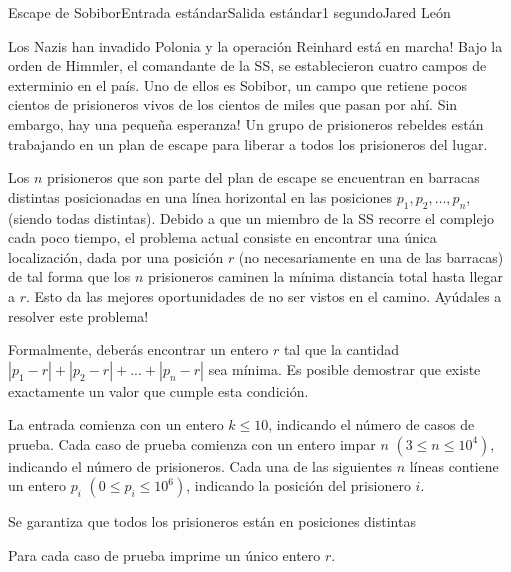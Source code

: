 \begin{problem}{Escape de Sobibor}{Entrada estándar}{Salida estándar}{1 segundo}{}{Jared León}

Los Nazis han invadido Polonia y la operación Reinhard está en marcha! Bajo la orden de Himmler, el comandante de la SS, se establecieron cuatro campos de exterminio en el país. Uno de ellos es Sobibor, un campo que retiene pocos cientos de prisioneros vivos de los cientos de miles que pasan por ahí. Sin embargo, hay una pequeña esperanza! Un grupo de prisioneros rebeldes están trabajando en un plan de escape para liberar a todos los prisioneros del lugar.

Los $n$ prisioneros que son parte del plan de escape se encuentran en barracas distintas posicionadas en una línea horizontal en las posiciones $p_1, p_2, \dots, p_n$, (siendo todas distintas). Debido a que un miembro de la SS recorre el complejo cada poco tiempo, el problema actual consiste en encontrar una única localización, dada por una posición $r$ (no necesariamente en una de las barracas) de tal forma que los $n$ prisioneros caminen la mínima distancia total hasta llegar a $r$. Esto da las mejores oportunidades de no ser vistos en el camino. Ayúdales a resolver este problema!

Formalmente, deberás encontrar un entero $r$ tal que la cantidad $|p_1 - r| + |p_2 - r| + ... + |p_n - r|$ sea mínima. Es posible demostrar que existe exactamente un valor que cumple esta condición.
\InputFile

La entrada comienza con un entero $k \leq 10$, indicando el número de casos de prueba. Cada caso de prueba comienza con un entero impar $n$ $(3 \leq n \leq 10^4)$, indicando el número de prisioneros. Cada una de las siguientes $n$ líneas contiene un entero $p_i$ $(0 \leq p_i \leq 10^6)$, indicando la posición del prisionero $i$.

Se garantiza que todos los prisioneros están en posiciones distintas


\OutputFile

Para cada caso de prueba imprime un único entero $r$.
\Example

\begin{example}
\end{example}

\end{problem}

